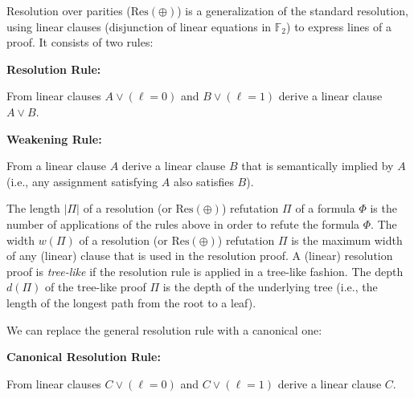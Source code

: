 \documentclass[10pt,a4paper]{article}
\begin{document}
Resolution over parities ($\text{Res}(\oplus)$) is a generalization of the standard resolution, using linear clauses (disjunction of linear equations in $\mathbb{F}_{2}$) to express lines of a proof.
It consists of two rules:\par


\textbf{Resolution Rule:}



From linear clauses $A\vee(\ell=0)$ and $B\vee(\ell=1)$ derive a linear clause $A\vee B$.\par



\textbf{Weakening Rule:}



From a linear clause $A$ derive a linear clause $B$ that is semantically implied by $A$ (i.e., any assignment satisfying $A$ also satisfies $B$).\par





The length $|\Pi|$ of a resolution (or $\text{Res}(\oplus)$) refutation $\Pi$ of a formula $\Phi$ is the number of applications of the rules above in order to refute the formula $\Phi.$
The width $w(\Pi)$ of a resolution (or $\text{Res}(\oplus)$) refutation $\Pi$ is the maximum width of any (linear) clause that is used in the resolution proof.
A (linear) resolution proof is \emph{tree-like} if the resolution rule is applied in a tree-like fashion.
The depth $d(\Pi)$ of the tree-like proof $\Pi$ is the depth of the underlying tree (i.e., the length of the longest path from the root to a leaf).\par




We can replace the general resolution rule with a canonical one:\par


\textbf{Canonical Resolution Rule:}



From linear clauses $C\vee(\ell=0)$ and $C\vee(\ell=1)$ derive a linear clause $C$.\par
\end{document}

